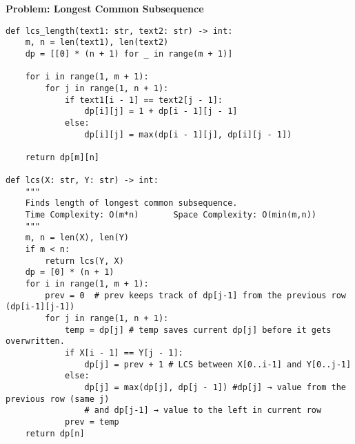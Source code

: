 \noindent\textbf{Problem: Longest Common Subsequence}
\begin{center}
\end{center}
\begin{verbatim}
def lcs_length(text1: str, text2: str) -> int:
    m, n = len(text1), len(text2)
    dp = [[0] * (n + 1) for _ in range(m + 1)]

    for i in range(1, m + 1):
        for j in range(1, n + 1):
            if text1[i - 1] == text2[j - 1]:
                dp[i][j] = 1 + dp[i - 1][j - 1]
            else:
                dp[i][j] = max(dp[i - 1][j], dp[i][j - 1])

    return dp[m][n]

def lcs(X: str, Y: str) -> int:
    """
    Finds length of longest common subsequence.
    Time Complexity: O(m*n)       Space Complexity: O(min(m,n))
    """
    m, n = len(X), len(Y)
    if m < n:
        return lcs(Y, X)
    dp = [0] * (n + 1)
    for i in range(1, m + 1):
        prev = 0  # prev keeps track of dp[j-1] from the previous row (dp[i-1][j-1])
        for j in range(1, n + 1):
            temp = dp[j] # temp saves current dp[j] before it gets overwritten.
            if X[i - 1] == Y[j - 1]:
                dp[j] = prev + 1 # LCS between X[0..i-1] and Y[0..j-1]
            else:
                dp[j] = max(dp[j], dp[j - 1]) #dp[j] → value from the previous row (same j) 
                # and dp[j-1] → value to the left in current row
            prev = temp
    return dp[n]
\end{verbatim}

